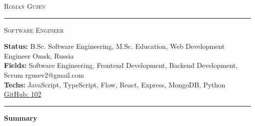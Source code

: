 \documentclass[10pt,A4]{article}
\newcommand{\cvsection}[1]
{
	\begin{center}
		\large\textcolor{sectcol}{\textbf{#1}}
	\end{center}
}
\newcommand{\metasection}[2]
{
    \footnotesize{#2} \hspace*{\fill} \footnotesize{#1}\\[1pt]
}
\begin{document}
\pagestyle{fancy}	








\vspace{-8pt}
\begin{center}
	\huge \textsc{Roman Gusev} \textcolor{sectcol}{\rule[-1mm]{1mm}{0.75cm}} \textsc{Software Engineer}\\[2pt]
\end{center}

\vspace{6pt}

\metasection{Omsk, Russia}{\textbf{Status:} B.Sc. Software Engineering, M.Sc. Education, Web Development Engineer}
\metasection{rgusev2@gmail.com}{\textbf{Fields:} Software Engineering, Frontend Development, Backend Development, Scrum} 
\metasection{\href{https://github.com/102}{GitHub: 102}}{\textbf{Techs:} JavaScript, TypeScript, Flow, React, Express, MongoDB, Python}
\vspace{-2pt}
\textcolor{softcol}{\hrule}
\vspace{6pt}

\normalsize

\vspace{-6pt}
\cvsection{Summary}
\vspace{-6pt}
\end{document}
